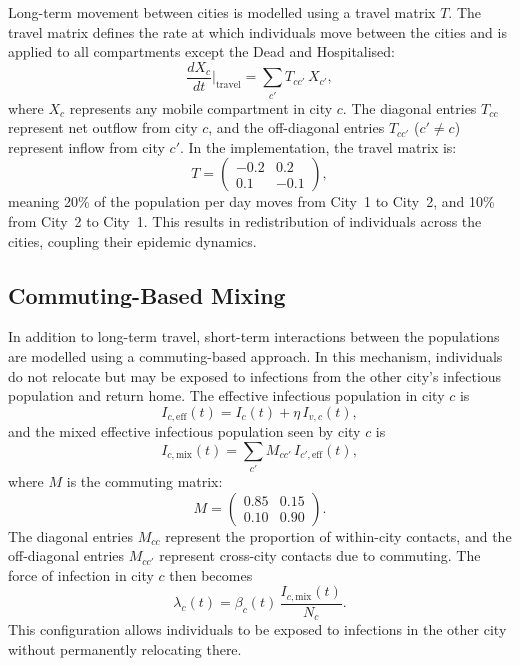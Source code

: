 Long-term movement between cities is modelled using a travel matrix $T$.
The travel matrix defines the rate at which individuals move between the cities and is applied to all compartments except the Dead and Hospitalised:
\begin{equation}
  \frac{dX_c}{dt}\bigg|_{\mathrm{travel}} = \sum_{c'} T_{cc'}\,X_{c'},
\end{equation}
where $X_c$ represents any mobile compartment in city $c$.
The diagonal entries $T_{cc}$ represent net outflow from city $c$, and the off-diagonal entries $T_{cc'}$ ($c' \neq c$) represent inflow from city $c'$.
In the implementation, the travel matrix is:
\begin{equation}
  T = \begin{pmatrix} -0.2 & 0.2 \\ 0.1 & -0.1 \end{pmatrix},
\end{equation}
meaning 20\% of the population per day moves from City~1 to City~2, and 10\% from City~2 to City~1.
This results in redistribution of individuals across the cities, coupling their epidemic dynamics.

\subsection{Commuting-Based Mixing}
\label{sec:commuting}

In addition to long-term travel, short-term interactions between the populations are modelled using a commuting-based approach.
In this mechanism, individuals do not relocate but may be exposed to infections from the other city's infectious population and return home.
The effective infectious population in city $c$ is
\begin{equation}
  I_{c,\mathrm{eff}}(t) = I_c(t) + \eta\,I_{v,c}(t),
\end{equation}
and the mixed effective infectious population seen by city $c$ is
\begin{equation}
  I_{c,\mathrm{mix}}(t) = \sum_{c'} M_{cc'}\,I_{c',\mathrm{eff}}(t),
\end{equation}
where $M$ is the commuting matrix:
\begin{equation}
  M = \begin{pmatrix} 0.85 & 0.15 \\ 0.10 & 0.90 \end{pmatrix}.
\end{equation}
The diagonal entries $M_{cc}$ represent the proportion of within-city contacts, and the off-diagonal entries $M_{cc'}$ represent cross-city contacts due to commuting.
The force of infection in city $c$ then becomes
\begin{equation}
  \lambda_c(t) = \beta_c(t)\,\frac{I_{c,\mathrm{mix}}(t)}{N_c}.
\end{equation}
This configuration allows individuals to be exposed to infections in the other city without permanently relocating there.

